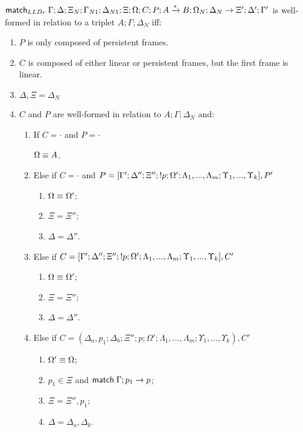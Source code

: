 \begin{definition}
$\mathsf{match}_{LLDc} \; \Gamma; \Delta; \Xi_N; \Gamma_{N1}; \Delta_{N1}; \Xi; \Omega; C; P; A \xrightarrow{*} B; \Omega_N; \Delta_N \rightarrow \Xi'; \Delta'; \Gamma'$ is well-formed in relation to a triplet $A; \Gamma; \Delta_{N}$ iff:

\begin{enumerate}
   \item $P$ is only composed of persistent frames.
   \item $C$ is composed of either linear or persistent frames, but the first frame is linear.
   \item $\Delta, \Xi = \Delta_{N}$
   \item $C$ and $P$ are well-formed in relation to $A; \Gamma; \Delta_{N}$ and:
   \begin{enumerate}
      \item If $C = \cdot$ and $P = \cdot$
      
      $\Omega \equiv A$.
      
      \item Else if $C = \cdot$ and $P = [\Gamma'; \Delta''; \Xi''; {!} p; \Omega'; \Lambda_1, ..., \Lambda_m; \Upsilon_1, ..., \Upsilon_k], P'$
      
      \begin{enumerate}
         \item $\Omega \equiv \Omega'$;
         \item $\Xi = \Xi''$;
         \item $\Delta = \Delta''$.
      \end{enumerate}
      
      \item Else if $C = [\Gamma'; \Delta''; \Xi''; {!} p; \Omega'; \Lambda_1, ..., \Lambda_m; \Upsilon_1, ..., \Upsilon_k], C'$
      \begin{enumerate}
         \item $\Omega \equiv \Omega'$;
         \item $\Xi = \Xi''$;
         \item $\Delta = \Delta''$.
      \end{enumerate}
      
      \item Else if $C = (\Delta_a, p_1; \Delta_b; \Xi''; p; \Omega'; \Lambda_1, ..., \Lambda_m; \Upsilon_1, ..., \Upsilon_k), C'$
   
      \begin{enumerate}
         \item $\Omega' \equiv \Omega$;
         \item $p_1 \in \Xi$ and $\mathsf{match} \; \Gamma; p_1 \rightarrow p$;
         \item $\Xi = \Xi'', p_1$;
         \item $\Delta = \Delta_a, \Delta_b$.
      \end{enumerate}
   \end{enumerate}
      
\end{enumerate}

\end{definition}
